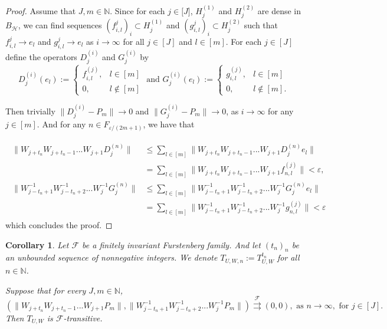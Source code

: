 \documentclass{article}
\newtheorem {corollary}[theorem]{Corollary}
\begin{document}
\begin{proof}
Assume that $J,m\in \mathbb{N}$. Since for each $j\in\mathbb [J]$, $H^{(1)}_{j}$ and $H^{(2)}_{j}$ are dense in $B_{\mathcal{H}}$, we can find sequences $(f^{j}_{i,l})_{i}\subset H^{(1)}_{j}$  and $(g^{j}_{i,l})_{i}\subset H^{(2)}_{j}$ such that $f^{j}_{i,l}\rightarrow e_{l}$ and $g^{j}_{i,l}\rightarrow e_{l}$ as $i\rightarrow \infty$ for all $j\in[J]$ and $l\in [m]$.
For each $j\in[J]$ define the operators $D^{(i)}_{j}$ and $G^{(i)}_{j}$ by
\begin{displaymath}
D^{(i)}_{j}(e_{l}):=\left\{ \begin{array}{ll}
 f^{(j)}_{i,l}, &  l\in[m]\\
 0, & l \notin [m]
\end{array} \right.
\textrm{ and     }
G^{(i)}_{j}(e_{l}):=\left\{ \begin{array}{ll}
 g^{(j)}_{i,l}, &  l\in[m]\\
 0, & l \notin [m].
\end{array} \right.
\end{displaymath}

Then trivially  $\|D^{(i)}_{j}-P_{m}\|\rightarrow 0$ and $\|G^{(i)}_{j}-P_{m}\|\rightarrow 0$, as $i\rightarrow \infty$ for any $j\in[m]$.
And for any $n\in F_{\varepsilon/(2m+1)}$, we have that

\begin{eqnarray}\begin{split}\nonumber
\|W_{j+t_{n}}W_{j+t_{n}-1}...W_{j+1}D^{(n)}_{j}\|&\leq \sum_{l\in[m]}\|W_{j+t_{n}}W_{j+t_{n}-1}...W_{j+1}D^{(n)}_{j}e_{l}\| \\ &=\sum_{l\in[m]}\|W_{j+t_{n}}W_{j+t_{n}-1}...W_{j+1}f^{(j)}_{n,l}\|<\varepsilon,\\
 \|W^{-1}_{j-t_{n}+1}W^{-1}_{j-t_{n}+2}...W^{-1}_{j}G^{(n)}_{j}\|&\leq \sum_{l\in[m]}\|W^{-1}_{j-t_{n}+1}W^{-1}_{j-t_{n}+2}...W^{-1}_{j}G^{(n)}_{j}e_{l}\|\\
&=\sum_{l\in[m]}\|W^{-1}_{j-t_{n}+1}W^{-1}_{j-t_{n}+2}...W^{-1}_{j}g^{(j)}_{n,l}\|<\varepsilon
\end{split}\end{eqnarray}
which concludes the proof.
\end{proof}

\begin{corollary}\label{co3.3}
Let $\mathcal{F}$ be a finitely invariant Furstenberg family. And let $(t_{n})_{n}$ be an unbounded sequence of nonnegative integers. We denote $T_{U,W,n}:=T^{t_{n}}_{U,W}$ for all $n\in \mathbb{N}$.

Suppose that for every $J, m\in\mathbb{N}$,
\[\left(\|W_{j+t_{n}}W_{j+t_{n}-1}...W_{j+1}P_{m}\|, \|W^{-1}_{j-t_{n}+1}W^{-1}_{j-t_{n}+2}...W^{-1}_{j}P_{m}\|\right)\stackrel{\mathcal F}{\rightrightarrows}(0, 0), \textrm{ as } n\rightarrow \infty, \textrm{ for } j\in[J].\]
Then $T_{U,W}$ is $\mathcal{F}$-transitive.
\end{corollary}
\end{document}
